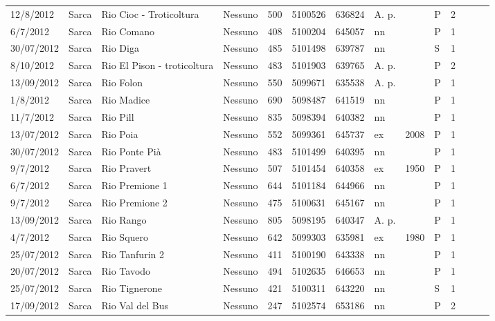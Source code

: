 \documentclass[11pt,a4paper,italian,twoside,openany]{memoir}
\begin{document}
\begin{longtable}[c]{p{}p{}p{}p{}p{}p{}p{}p{}p{}p{}l}
12/8/2012 & Sarca  & Rio Cioc - Troticoltura   & Nessuno & 500 & 5100526  & 636824 & A. p.  &   & P & 2   \\
 6/7/2012  & Sarca  & Rio Comano & Nessuno & 408 & 5100204  & 645057 & nn   &   & P & 1   \\
30/07/2012 & Sarca  & Rio Diga   & Nessuno & 485 & 5101498  & 639787 & nn   &   & S & 1   \\
 8/10/2012 & Sarca  & Rio El Pison - troticoltura & Nessuno & 483 & 5101903 & 639765  & A. p.   & & P   & 2 & &   &  & \\
13/09/2012 & Sarca  & Rio Folon  & Nessuno & 550 & 5099671  & 635538 & A. p.  &   & P & 1   \\
 1/8/2012  & Sarca  & Rio Madice & Nessuno & 690 & 5098487  & 641519 & nn   &   & P & 1   \\
11/7/2012 & Sarca  & Rio Pill   & Nessuno & 835 & 5098394  & 640382 & nn   &   & P & 1   \\
 13/07/2012 & Sarca  & Rio Poia   & Nessuno & 552 & 5099361  & 645737 & ex   & 2008  & P & 1   \\
30/07/2012 & Sarca  & Rio Ponte Pià  & Nessuno & 483 & 5101499  & 640395 & nn   &   & P & 1   \\
 9/7/2012  & Sarca  & Rio Pravert & Nessuno & 507 & 5101454  & 640358 & ex   & 1950  & P & 1   \\
6/7/2012  & Sarca  & Rio Premione 1 & Nessuno & 644 & 5101184  & 644966 & nn   &   & P & 1   \\
 9/7/2012  & Sarca  & Rio Premione 2 & Nessuno & 475 & 5100631  & 645167 & nn   &   & P & 1   \\
13/09/2012 & Sarca  & Rio Rango  & Nessuno & 805 & 5098195  & 640347 & A. p.  &   & P & 1   \\
 4/7/2012  & Sarca  & Rio Squero & Nessuno & 642 & 5099303  & 635981 & ex   & 1980  & P & 1   \\
25/07/2012 & Sarca  & Rio Tanfurin 2 & Nessuno & 411 & 5100190  & 643338 & nn   &   & P & 1   \\
 20/07/2012 & Sarca  & Rio Tavodo & Nessuno & 494 & 5102635  & 646653 & nn   &   & P & 1   \\
25/07/2012 & Sarca  & Rio Tignerone  & Nessuno & 421 & 5100311  & 643220 & nn   &   & S & 1   \\
 17/09/2012 & Sarca  & Rio Val del Bus & Nessuno & 247 & 5102574  & 653186 & nn   &   & P & 2   \\

\end{longtable}
\end{document}
